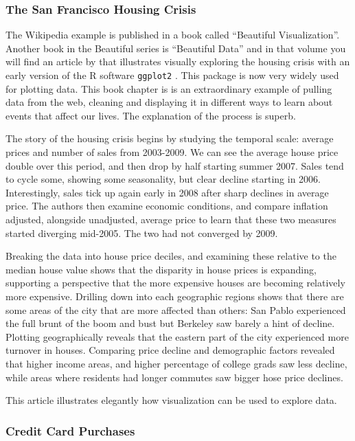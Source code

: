 \documentclass[11pt]{article}
\begin{document}
\subsubsection{The San Francisco Housing Crisis}

The Wikipedia example is published in a book called ``Beautiful Visualization''. Another book in the Beautiful series is ``Beautiful Data'' and in that volume you will find an article by \citet{SFHousing} that illustrates visually exploring the housing crisis with an early version of the R software {\tt ggplot2} \citep{wickham2009ggplot2}. This package is now very widely used for plotting data. This book chapter is is an extraordinary example of pulling data from the web, cleaning and displaying it in different ways to learn about events that affect our lives. The explanation of the process is superb.

The story of the housing crisis begins by studying the temporal scale: average prices and number of sales from 2003-2009. We can see the average house price double over this period, and then drop by half starting summer 2007. Sales tend to cycle some, showing some seasonality, but clear decline starting in 2006. Interestingly, sales tick up again early in 2008 after sharp declines in average price. The authors then examine economic conditions, and compare inflation adjusted,  alongside unadjusted, average price to learn that these two measures started diverging mid-2005. The two had not converged by 2009.

Breaking the data into house price deciles, and examining these relative to the median house value shows that the disparity in house prices is expanding, supporting a perspective that the more expensive houses are becoming relatively more expensive. Drilling down into each geographic regions shows that there are some areas of the city that are more affected than others: San Pablo experienced the full brunt of the boom and bust but Berkeley saw barely a hint of decline. Plotting  geographically  reveals that the eastern part of the city experienced more turnover in houses. Comparing price decline and demographic factors revealed that higher income areas, and higher percentage of college grads saw less decline, while areas where residents had longer commutes saw bigger hose price declines.

This article illustrates elegantly how visualization can be used to explore data.

\subsubsection{Credit Card Purchases}
\end{document}
